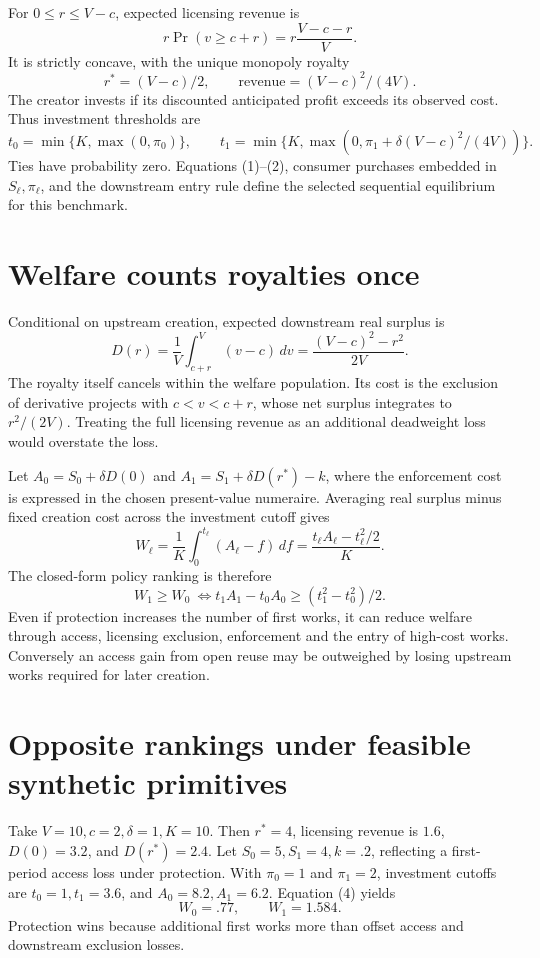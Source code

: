 \documentclass[11pt]{article}
\begin{document}
For $0\leq r\leq V-c$, expected licensing revenue is
\[
 r\Pr(v\geq c+r)=r\frac{V-c-r}{V}.
\]
It is strictly concave, with the unique monopoly royalty
\[
 r^*=(V-c)/2,
 \qquad \text{revenue}=(V-c)^2/(4V).                 \tag{1}
\]
The creator invests if its discounted anticipated profit exceeds its observed cost. Thus investment thresholds are
\[
 t_0=\min\{K,\max(0,\pi_0)\},\qquad
 t_1=\min\{K,\max(0,\pi_1+\delta(V-c)^2/(4V))\}.     \tag{2}
\]
Ties have probability zero. Equations (1)--(2), consumer purchases embedded in $S_\ell,\pi_\ell$, and the downstream entry rule define the selected sequential equilibrium for this benchmark.

\section*{Welfare counts royalties once}
Conditional on upstream creation, expected downstream real surplus is
\[
 D(r)=\frac1V\int_{c+r}^V(v-c)\,dv
      =\frac{(V-c)^2-r^2}{2V}.                       \tag{3}
\]
The royalty itself cancels within the welfare population. Its cost is the exclusion of derivative projects with $c<v<c+r$, whose net surplus integrates to $r^2/(2V)$. Treating the full licensing revenue as an additional deadweight loss would overstate the loss.

Let $A_0=S_0+\delta D(0)$ and $A_1=S_1+\delta D(r^*)-k$, where the enforcement cost is expressed in the chosen present-value numeraire. Averaging real surplus minus fixed creation cost across the investment cutoff gives
\[
 W_\ell=\frac1K\int_0^{t_\ell}(A_\ell-f)\,df
       =\frac{t_\ell A_\ell-t_\ell^2/2}{K}.          \tag{4}
\]
The closed-form policy ranking is therefore
\[
 W_1\geq W_0\ \Longleftrightarrow
 t_1A_1-t_0A_0\geq(t_1^2-t_0^2)/2.                  \tag{5}
\]
Even if protection increases the number of first works, it can reduce welfare through access, licensing exclusion, enforcement and the entry of high-cost works. Conversely an access gain from open reuse may be outweighed by losing upstream works required for later creation.

\section*{Opposite rankings under feasible synthetic primitives}
Take $V=10,c=2,\delta=1,K=10$. Then $r^*=4$, licensing revenue is $1.6$, $D(0)=3.2$, and $D(r^*)=2.4$. Let $S_0=5,S_1=4,k=.2$, reflecting a first-period access loss under protection. With $\pi_0=1$ and $\pi_1=2$, investment cutoffs are $t_0=1,t_1=3.6$, and $A_0=8.2,A_1=6.2$. Equation (4) yields
\[
 W_0=.77,\qquad W_1=1.584.
\]
Protection wins because additional first works more than offset access and downstream exclusion losses.
\end{document}
